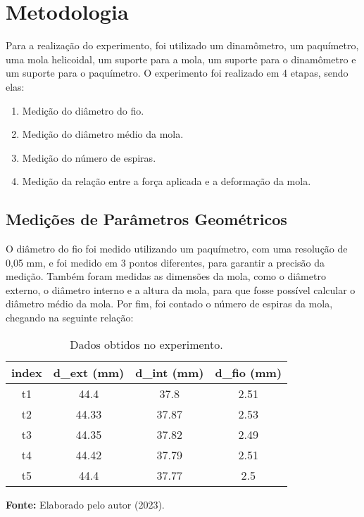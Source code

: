 \newpage


\section{Metodologia}
Para a realização do experimento, foi utilizado um dinamômetro, um paquímetro, uma mola helicoidal, um suporte para a mola, um suporte para o dinamômetro e um suporte para o paquímetro.
O experimento foi realizado em 4 etapas, sendo elas:

\begin{enumerate}
    \item Medição do diâmetro do fio.
    \item Medição do diâmetro médio da mola.
    \item Medição do número de espiras.
    \item Medição da relação entre a força aplicada e a deformação da mola.
\end{enumerate}

\subsection{Medições de Parâmetros Geométricos}
O diâmetro do fio foi medido utilizando um paquímetro, com uma resolução de 0,05 mm, e foi medido em 3 pontos diferentes, para garantir a precisão da medição.
Também foram medidas as dimensões da mola, como o diâmetro externo, o diâmetro interno e a altura da mola, para que fosse possível calcular o diâmetro médio da mola.
Por fim, foi contado o número de espiras da mola, chegando na seguinte relação:

\begin{center}
    \begin{table}[h]
        \centering
        \begin{tabular}{|c|c|c|c|}
            \rowcolor[HTML]{DAE8FC}
            \hline
            index & d\_ext (mm) & d\_int (mm) & d\_fio (mm) \\ \hline
            t1   & 44.4        & 37.8        & 2.51        \\ \hline
            t2   & 44.33       & 37.87       & 2.53        \\ \hline
            t3   & 44.35       & 37.82       & 2.49        \\ \hline
            t4   & 44.42       & 37.79       & 2.51        \\ \hline
            t5   & 44.4        & 37.77       & 2.5         \\ \hline
        \end{tabular}
        \caption{Dados obtidos no experimento.}
        \label{tab:dados_adquiridos}
        \textbf{Fonte:} Elaborado pelo autor (2023).
    \end{table}
\end{center}
